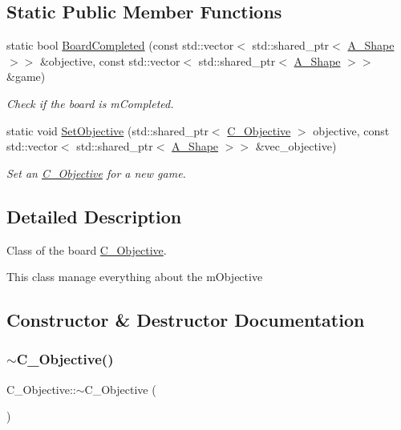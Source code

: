 \subsection*{Static Public Member Functions}
\begin{DoxyCompactItemize}
\item 
static bool \hyperlink{classC__Objective_a5ad5b8ed6a640c86276d34c6a7a58346}{Board\+Completed} (const std\+::vector$<$ std\+::shared\+\_\+ptr$<$ \hyperlink{classA__Shape}{A\+\_\+\+Shape} $>$$>$ \&objective, const std\+::vector$<$ std\+::shared\+\_\+ptr$<$ \hyperlink{classA__Shape}{A\+\_\+\+Shape} $>$$>$ \&game)
\begin{DoxyCompactList}\small\item\em Check if the board is m\+Completed. \end{DoxyCompactList}\item 
static void \hyperlink{classC__Objective_a931d916840c73104815dbf529f9c866c}{Set\+Objective} (std\+::shared\+\_\+ptr$<$ \hyperlink{classC__Objective}{C\+\_\+\+Objective} $>$ objective, const std\+::vector$<$ std\+::shared\+\_\+ptr$<$ \hyperlink{classA__Shape}{A\+\_\+\+Shape} $>$$>$ \&vec\+\_\+objective)
\begin{DoxyCompactList}\small\item\em Set an \hyperlink{classC__Objective}{C\+\_\+\+Objective} for a new game. \end{DoxyCompactList}\end{DoxyCompactItemize}


\subsection{Detailed Description}
Class of the board \hyperlink{classC__Objective}{C\+\_\+\+Objective}. 

This class manage everything about the m\+Objective 

\subsection{Constructor \& Destructor Documentation}
\mbox{\label{classC__Objective_a4e05cb06acbee6d49734e2696cd419e9}} 
\subsubsection{\texorpdfstring{$\sim$\+C\+\_\+\+Objective()}{~C\_Objective()}}
{\footnotesize\ttfamily C\+\_\+\+Objective\+::$\sim$\+C\+\_\+\+Objective (\begin{DoxyParamCaption}{ }\end{DoxyParamCaption})}



